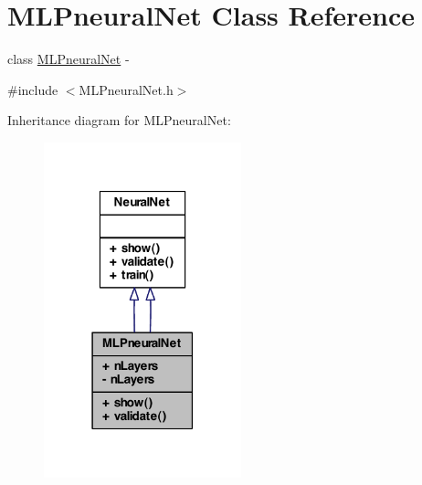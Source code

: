 \hypertarget{class_m_l_pneural_net}{
\section{MLPneuralNet Class Reference}
\label{class_m_l_pneural_net}
}


class \hyperlink{class_m_l_pneural_net}{MLPneuralNet} -\/  




{\ttfamily \#include $<$MLPneuralNet.h$>$}



Inheritance diagram for MLPneuralNet:\nopagebreak
\begin{figure}[H]
\begin{center}
\leavevmode
\includegraphics[width=162pt]{class_m_l_pneural_net__inherit__graph}
\end{center}
\end{figure}


